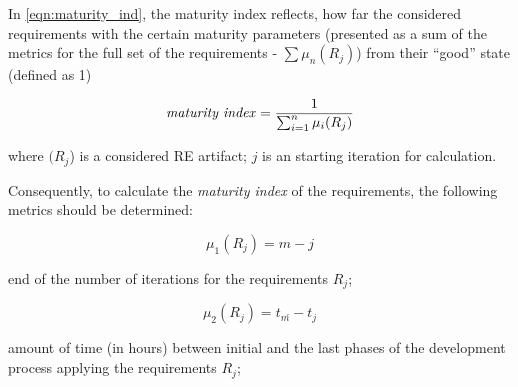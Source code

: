 In \autoref{eqn:maturity_ind}, the maturity index reflects, how far the considered requirements with the certain maturity parameters (presented as a sum of the metrics for the full set of the requirements - $\sum\mu_{n}(R_{j})$) from their ``good'' state (defined as 1)

  \begin{equation}\label{eqn:maturity_ind}
\textrm{\textit{maturity index}} = \frac{1}{\sum_{i=1}^{n}\mu_{i}(R_{j})}
	\end{equation}

where $(R_{j}$) is a considered RE artifact; $j$ is an starting iteration for calculation.

Consequently, to calculate the \textit{maturity index} of the requirements, the following metrics should be determined:

 \begin{equation}\label{eqn:mu1}
\mu_{1}(R_{j}) = m-j
	\end{equation}
	
\textrm{end of the number of iterations for the requirements} $R_{j}$;

 \begin{equation}\label{eqn:mu2}
\mu_{2}(R_{j}) = t_{m}\acute{}-t_{j}    
 \end{equation}

\textrm{amount of time (in hours) between initial and the last phases of the development process applying the requirements} $R_{j}$;

%





